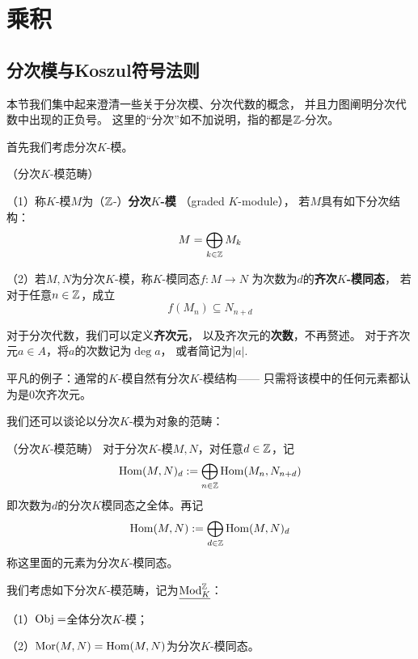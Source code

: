 \chapter{乘积}










\section{分次模与Koszul符号法则}

本节我们集中起来澄清一些关于分次模、分次代数的概念，
并且力图阐明分次代数中出现的正负号。
这里的“分次”如不加说明，指的都是$\mathbb{Z}$-分次。

首先我们考虑分次$K$-模。

\begin{definition}（分次$K$-模范畴）

（1）称$K$-模$M$为（$\mathbb{Z}$-）\textbf{分次$K$-模}
（graded $K$-module），
若$M$具有如下分次结构：
$$M=\bigoplus_{k\in\mathbb{Z}}M_k$$

（2）若$M,N$为分次$K$-模，称$K$-模同态$f:M\to N$
为次数为$d$的\textbf{齐次$K$-模同态}，
若对于任意$n\in \mathbb{Z}$，成立
$$f(M_n)\subseteq N_{n+d}$$
\end{definition}

对于分次代数，我们可以定义\textbf{齐次元}，
以及齐次元的\textbf{次数}，不再赘述。
对于齐次元$a\in A$，将$a$的次数记为$\deg a$，
或者简记为$|a|$.

平凡的例子：通常的$K$-模自然有分次$K$-模结构——
只需将该模中的任何元素都认为是$0$次齐次元。

我们还可以谈论以分次$K$-模为对象的范畴：

\begin{notation}（分次$K$-模范畴）
对于分次$K$-模$M,N$，对任意$d\in\mathbb{Z}$，记
$$\operatorname{Hom}(M,N)_d:=\bigoplus_{n\in\mathbb{Z}}\operatorname{Hom}(M_n,N_{n+d})$$
即次数为$d$的分次$K$模同态之全体。再记
$$\operatorname{Hom}(M,N):=\bigoplus_{d\in\mathbb{Z}}\operatorname{Hom}(M,N)_d$$
称这里面的元素为分次$K$-模同态。

我们考虑如下分次$K$-模范畴，记为$\underline{\operatorname{Mod}^{\mathbb{Z}}_{K}}$：

（1）$\operatorname{Obj}=$全体分次$K$-模；

（2）$\operatorname{Mor}(M,N)=\operatorname{Hom}(M,N)$为分次$K$-模同态。
\end{notation}

